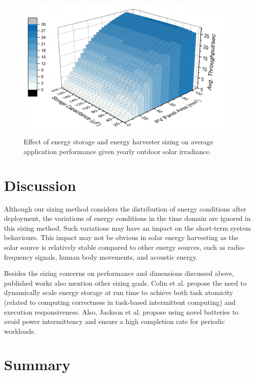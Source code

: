 \begin{figure}[H]
    \centering
    \includegraphics[width=13cm]{figure/work1/SizeHarSto}
    \caption{Effect of energy storage and energy harvester sizing on average application performance given yearly outdoor solar irradiance.}
    \label{Figure:SizeHarSto}
\end{figure} 


\section{Discussion}

Although our sizing method considers the distribution of energy conditions after deployment, the variations of energy conditions in the time domain are ignored in this sizing method. Such variations may have an impact on the short-term system behaviours. This impact may not be obvious in solar energy harvesting as the solar source is relatively stable compared to other energy sources, such as radio-frequency signals, human body movements, and acoustic energy. 

Besides the sizing concerns on performance and dimensions discussed above, published works also mention other sizing goals. Colin et al. \cite{Colin:2018:RES:3173162.3173210} propose the need to dynamically scale energy storage at run time to achieve both task atomicity (related to computing correctness in task-based intermittent computing) and execution responsiveness. Also, Jackson \cite{Jackson:2019:COC:3302506.3310400} et al. propose using novel batteries to avoid power intermittency and ensure a high completion rate for periodic workloads.


\section{Summary}


